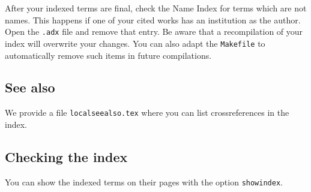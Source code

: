 After your indexed terms are final, check the Name Index for terms which are not names. This happens if one of your cited works has an institution as the author. Open the \verb+.adx+ file and remove that entry. Be aware that a recompilation of your index will overwrite your changes. You can also adapt the \verb+Makefile+ to automatically remove such items in future compilations. 



\subsection{See also}
We provide a file \verb+localseealso.tex+ where you can list crossreferences in the index. 

\subsection{Checking the index}

You can show the indexed terms on their pages with the option \verb+showindex+. 


